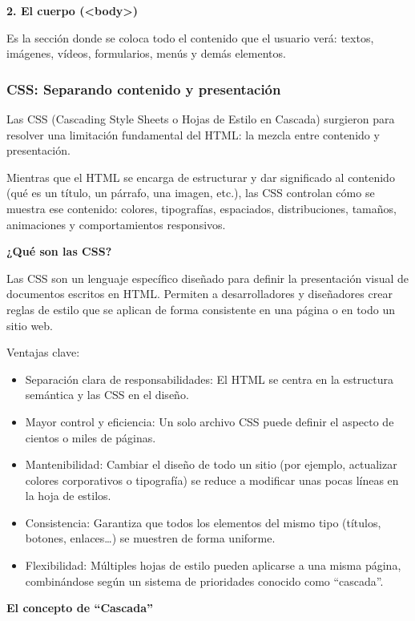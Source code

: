 \documentclass[11.5pt]{article}
\begin{document}
	\textbf{{\small 2. El cuerpo (<body>)}}
	
	Es la sección donde se coloca todo el contenido que el usuario verá: textos, imágenes, vídeos, formularios, menús y demás elementos.
	
	\subsubsection{CSS: Separando contenido y presentación}
	
	Las CSS (Cascading Style Sheets o Hojas de Estilo en Cascada) surgieron para resolver una limitación fundamental del HTML: la mezcla entre contenido y presentación.
	
	Mientras que el HTML se encarga de estructurar y dar significado al contenido (qué es un título, un párrafo, una imagen, etc.), las CSS controlan cómo se muestra ese contenido: colores, tipografías, espaciados, distribuciones, tamaños, animaciones y comportamientos responsivos.
	
	\noindent\textbf{{\large ¿Qué son las CSS?}}

	Las CSS son un lenguaje específico diseñado para definir la presentación visual de documentos escritos en HTML. Permiten a desarrolladores y diseñadores crear reglas de estilo que se aplican de forma consistente en una página o en todo un sitio web.
	
	Ventajas clave:
	
	\begin{itemize}
		\item Separación clara de responsabilidades: El HTML se centra en la estructura semántica y las CSS en el diseño.
		\item 	Mayor control y eficiencia: Un solo archivo CSS puede definir el aspecto de cientos o miles de páginas.
		\item 	Mantenibilidad: Cambiar el diseño de todo un sitio (por ejemplo, actualizar colores corporativos o tipografía) se reduce a modificar unas pocas líneas en la hoja de estilos.
		\item 	Consistencia: Garantiza que todos los elementos del mismo tipo (títulos, botones, enlaces…) se muestren de forma uniforme.
		\item 	Flexibilidad: Múltiples hojas de estilo pueden aplicarse a una misma página, combinándose según un sistema de prioridades conocido como “cascada”.
	\end{itemize}
	
	\noindent\textbf{{\large El concepto de “Cascada”}}
	
\end{document}
